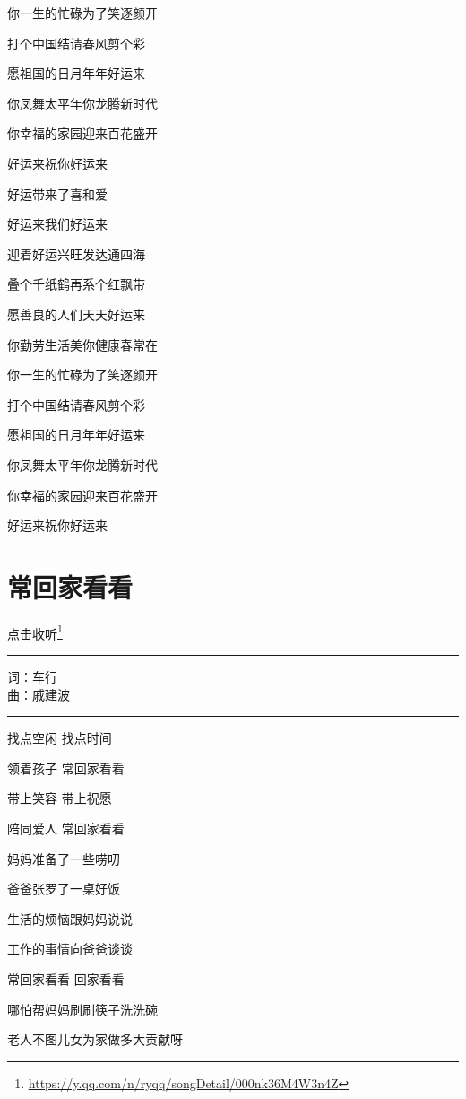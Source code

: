 \documentclass[]{ctexbook}
\renewcommand{\href}[2]{#2\footnote{\url{#1}}}
\begin{document}
你一生的忙碌为了笑逐颜开

打个中国结请春风剪个彩

愿祖国的日月年年好运来

你凤舞太平年你龙腾新时代

你幸福的家园迎来百花盛开

好运来祝你好运来

好运带来了喜和爱

好运来我们好运来

迎着好运兴旺发达通四海

叠个千纸鹤再系个红飘带

愿善良的人们天天好运来

你勤劳生活美你健康春常在

你一生的忙碌为了笑逐颜开

打个中国结请春风剪个彩

愿祖国的日月年年好运来

你凤舞太平年你龙腾新时代

你幸福的家园迎来百花盛开

好运来祝你好运来

\section*{常回家看看}\label{often-back-home}


\href{https://y.qq.com/n/ryqq/songDetail/000nk36M4W3n4Z}{点击收听}

\begin{center}\rule{0.5\linewidth}{0.5pt}\end{center}

词：车行\\
曲：戚建波

\begin{center}\rule{0.5\linewidth}{0.5pt}\end{center}

找点空闲 找点时间

领着孩子 常回家看看

带上笑容 带上祝愿

陪同爱人 常回家看看

妈妈准备了一些唠叨

爸爸张罗了一桌好饭

生活的烦恼跟妈妈说说

工作的事情向爸爸谈谈

常回家看看 回家看看

哪怕帮妈妈刷刷筷子洗洗碗

老人不图儿女为家做多大贡献呀
\end{document}

